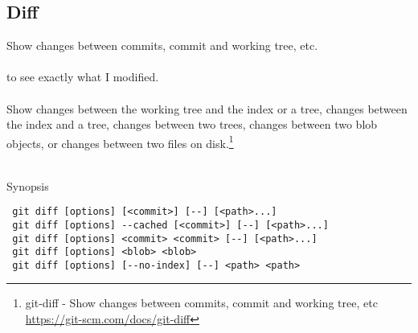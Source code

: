 
\subsection{Diff}
Show changes between commits, commit and working tree, etc.
\\
\\
 to see exactly what I modified.
\\
\\
Show changes between the working tree and the index or a tree,
changes between the index and a tree, changes between two trees,
changes between two blob objects, or changes between two files on
disk.\footnote{git-diff - Show changes between commits, commit and working tree, etc\\
\href{https://git-scm.com/docs/git-diff}{https://git-scm.com/docs/git-diff}}
\\
\\
\begin{bf}Synopsis\end{bf}
\begin{verbatim}
 git diff [options] [<commit>] [--] [<path>...]
 git diff [options] --cached [<commit>] [--] [<path>...]
 git diff [options] <commit> <commit> [--] [<path>...]
 git diff [options] <blob> <blob>
 git diff [options] [--no-index] [--] <path> <path>
\end{verbatim}
